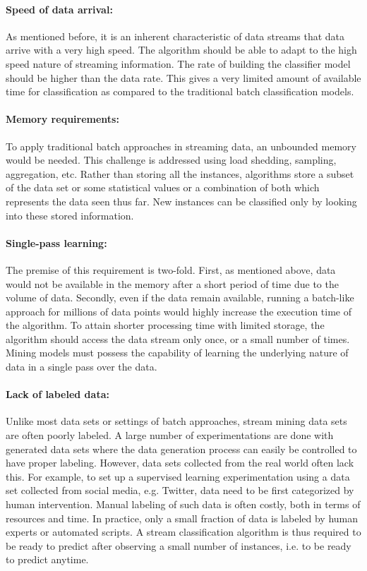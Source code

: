 \paragraph{Speed of data arrival:}
As mentioned before, it is an inherent characteristic of data streams that data arrive with a very high speed. The algorithm should be able to adapt to the high speed nature of streaming information. The rate of building the classifier model should be higher than the data rate. This gives a very limited amount of available time for classification as compared to the traditional batch classification models.

\paragraph{Memory requirements:}
To apply traditional batch approaches in streaming data, an unbounded memory would be needed. This challenge is  addressed using load shedding, sampling, aggregation, etc. Rather than storing all the instances, algorithms store a subset of the data set or some statistical values or a combination of both which represents the data seen thus far. New instances can be classified only by looking into these stored information. 

\paragraph{Single-pass learning:}
The premise of this requirement is two-fold. First, as mentioned above, data would not be available in the memory after a short period of time due to the volume of data. Secondly, even if the data remain available, running a batch-like approach for millions of data points would highly increase the execution time of the algorithm. To attain shorter processing time with limited storage, the algorithm should access the data stream only once, or a small number of times. Mining models must possess the capability of learning the underlying nature of data in a single pass over the data.

\paragraph{Lack of labeled data:}
Unlike most data sets or settings of batch approaches, stream mining data sets are often poorly labeled. A large number of experimentations are done with generated data sets where the data generation process can easily be controlled to have proper labeling. However, data sets collected from the real world often lack this. For example, to set up a supervised learning experimentation using a data set collected from social media, e.g. Twitter, data need to be first categorized by human intervention. Manual labeling of such data is often costly, both in terms of resources and time. In practice, only a small fraction of data is labeled by human experts or automated scripts. A stream classification algorithm is thus required to be ready to predict after observing a small number of instances, i.e. to be ready to predict anytime.


